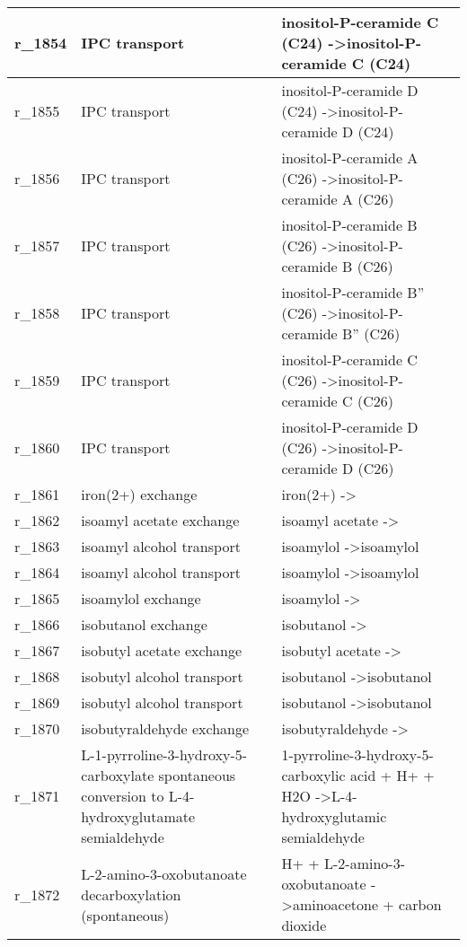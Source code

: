 \begin{landscape}
{\begin{longtable}{|l|p{7cm}|p{15cm}|}
r\_1854 & IPC transport & inositol-P-ceramide C (C24)  -\textgreater inositol-P-ceramide C (C24) \\ \hline
r\_1855 & IPC transport & inositol-P-ceramide D (C24)  -\textgreater inositol-P-ceramide D (C24) \\ \hline
r\_1856 & IPC transport & inositol-P-ceramide A (C26)  -\textgreater inositol-P-ceramide A (C26) \\ \hline
r\_1857 & IPC transport & inositol-P-ceramide B (C26)  -\textgreater inositol-P-ceramide B (C26) \\ \hline
r\_1858 & IPC transport & inositol-P-ceramide B'' (C26)  -\textgreater inositol-P-ceramide B'' (C26) \\ \hline
r\_1859 & IPC transport & inositol-P-ceramide C (C26)  -\textgreater inositol-P-ceramide C (C26) \\ \hline
r\_1860 & IPC transport & inositol-P-ceramide D (C26)  -\textgreater inositol-P-ceramide D (C26) \\ \hline
r\_1861 & iron(2+) exchange & iron(2+)  -\textgreater{} \\ \hline
r\_1862 & isoamyl acetate exchange & isoamyl acetate  -\textgreater{} \\ \hline
r\_1863 & isoamyl alcohol transport & isoamylol  -\textgreater isoamylol \\ \hline
r\_1864 & isoamyl alcohol transport & isoamylol  -\textgreater isoamylol \\ \hline
r\_1865 & isoamylol exchange & isoamylol  -\textgreater{} \\ \hline
r\_1866 & isobutanol exchange & isobutanol  -\textgreater{} \\ \hline
r\_1867 & isobutyl acetate exchange & isobutyl acetate  -\textgreater{} \\ \hline
r\_1868 & isobutyl alcohol transport & isobutanol  -\textgreater isobutanol \\ \hline
r\_1869 & isobutyl alcohol transport & isobutanol  -\textgreater isobutanol \\ \hline
r\_1870 & isobutyraldehyde exchange & isobutyraldehyde  -\textgreater{} \\ \hline
r\_1871 & L-1-pyrroline-3-hydroxy-5-carboxylate spontaneous conversion to L-4-hydroxyglutamate semialdehyde & 1-pyrroline-3-hydroxy-5-carboxylic acid + H+ + H2O  -\textgreater L-4-hydroxyglutamic semialdehyde \\ \hline
r\_1872 & L-2-amino-3-oxobutanoate decarboxylation (spontaneous) & H+ + L-2-amino-3-oxobutanoate  -\textgreater aminoacetone + carbon dioxide \\ \hline

\end{longtable}}
\end{landscape}
